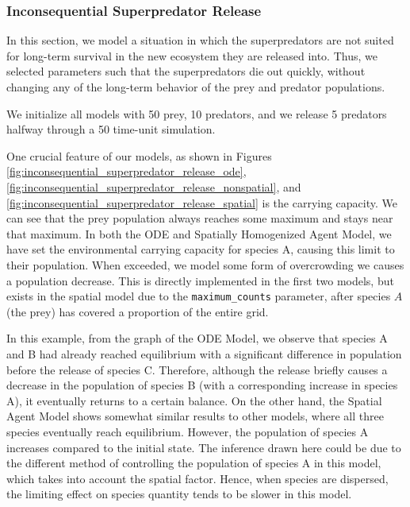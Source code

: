 \documentclass[journal]{IEEEtran}
\begin{document}
\subsubsection{Inconsequential Superpredator Release}
In this section, we model a situation in which the superpredators are not suited for long-term survival in the new ecosystem they are released into. Thus, we selected parameters such that the superpredators die out quickly, without changing any of the long-term behavior of the prey and predator populations.\par
We initialize all models with 50 prey, 10 predators, and we release 5 predators halfway through a 50 time-unit simulation.\par
One crucial feature of our models, as shown in Figures \ref{fig:inconsequential_superpredator_release_ode},\ref{fig:inconsequential_superpredator_release_nonspatial}, and \ref{fig:inconsequential_superpredator_release_spatial} is the carrying capacity. We can see that the prey population always reaches some maximum and stays near that maximum.
In both the ODE and Spatially Homogenized Agent Model, we have set the environmental carrying capacity for species A, causing this limit to their population. When exceeded, we model some form of overcrowding we causes a population decrease. This is directly implemented in the first two models, but exists in the spatial model due to the \verb|maximum_counts| parameter, after species $A$ (the prey) has covered a proportion of the entire grid.\par
In this example, from the graph of the ODE Model, we observe that species A and B had already reached equilibrium with a significant difference in population before the release of species C. Therefore, although the release briefly causes a decrease in the population of species B (with a corresponding increase in species A), it eventually returns to a certain balance. On the other hand, the Spatial Agent Model shows somewhat similar results to other models, where all three species eventually reach equilibrium. However, the population of species A increases compared to the initial state. The inference drawn here could be due to the different method of controlling the population of species A in this model, which takes into account the spatial factor. Hence, when species are dispersed, the limiting effect on species quantity tends to be slower in this model.
\end{document}
